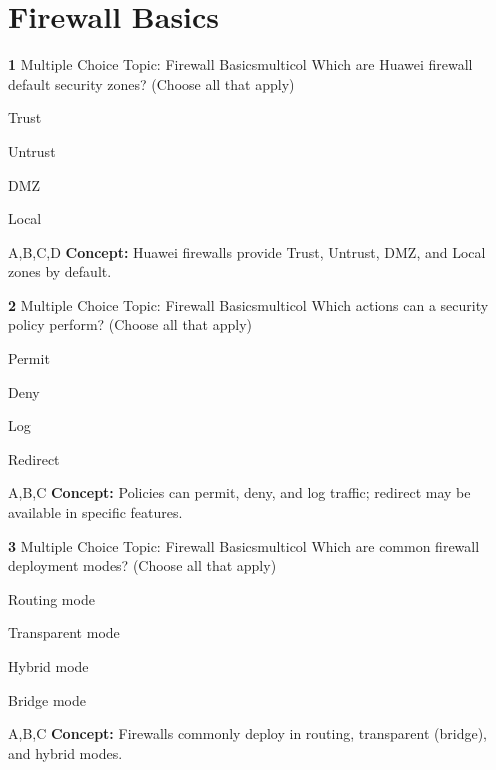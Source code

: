 \documentclass[10pt,a4paper]{article}
\begin{document}
\section{Firewall Basics}
\begin{qcard}{\color{white}\textbf{1} \hfill \small Multiple Choice \textbar{} Topic: Firewall Basics}{multicol}
Which are Huawei firewall default security zones? (Choose all that apply)

\begin{qoptions}
\item Trust
\item Untrust
\item DMZ
\item Local
\end{qoptions}
\begin{explainbox}{A,B,C,D}
\textbf{Concept:} Huawei firewalls provide Trust, Untrust, DMZ, and Local zones by default.
\end{explainbox}
\end{qcard}

\begin{qcard}{\color{white}\textbf{2} \hfill \small Multiple Choice \textbar{} Topic: Firewall Basics}{multicol}
Which actions can a security policy perform? (Choose all that apply)

\begin{qoptions}
\item Permit
\item Deny
\item Log
\item Redirect
\end{qoptions}
\begin{explainbox}{A,B,C}
\textbf{Concept:} Policies can permit, deny, and log traffic; redirect may be available in specific features.
\end{explainbox}
\end{qcard}

\begin{qcard}{\color{white}\textbf{3} \hfill \small Multiple Choice \textbar{} Topic: Firewall Basics}{multicol}
Which are common firewall deployment modes? (Choose all that apply)

\begin{qoptions}
\item Routing mode
\item Transparent mode
\item Hybrid mode
\item Bridge mode
\end{qoptions}
\begin{explainbox}{A,B,C}
\textbf{Concept:} Firewalls commonly deploy in routing, transparent (bridge), and hybrid modes.
\end{explainbox}
\end{qcard}
\end{document}
